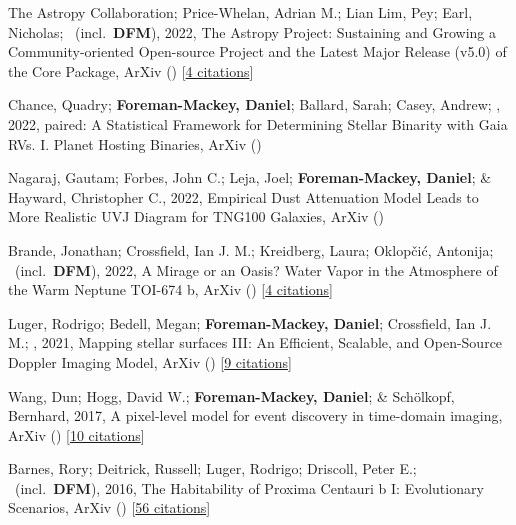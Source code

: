 \item[{\color{numcolor}\scriptsize9}] The Astropy Collaboration; Price-Whelan, Adrian M.; Lian Lim, Pey; Earl, Nicholas; \etal\ (incl.\ \textbf{DFM}), 2022, The Astropy Project: Sustaining and Growing a Community-oriented Open-source Project and the Latest Major Release (v5.0) of the Core Package, ArXiv () [\href{https://ui.adsabs.harvard.edu/abs/2022arXiv220614220T}{4 citations}]

\item[{\color{numcolor}\scriptsize8}] Chance, Quadry; \textbf{Foreman-Mackey, Daniel}; Ballard, Sarah; Casey, Andrew; \etal, 2022, paired: A Statistical Framework for Determining Stellar Binarity with Gaia RVs. I. Planet Hosting Binaries, ArXiv ()

\item[{\color{numcolor}\scriptsize7}] Nagaraj, Gautam; Forbes, John C.; Leja, Joel; \textbf{Foreman-Mackey, Daniel}; \& Hayward, Christopher C., 2022, Empirical Dust Attenuation Model Leads to More Realistic UVJ Diagram for TNG100 Galaxies, ArXiv ()

\item[{\color{numcolor}\scriptsize6}] Brande, Jonathan; Crossfield, Ian J. M.; Kreidberg, Laura; Oklop{\v{c}}i{\'c}, Antonija; \etal\ (incl.\ \textbf{DFM}), 2022, A Mirage or an Oasis? Water Vapor in the Atmosphere of the Warm Neptune TOI-674 b, ArXiv () [\href{https://ui.adsabs.harvard.edu/abs/2022arXiv220104197B}{4 citations}]

\item[{\color{numcolor}\scriptsize5}] Luger, Rodrigo; Bedell, Megan; \textbf{Foreman-Mackey, Daniel}; Crossfield, Ian J. M.; \etal, 2021, Mapping stellar surfaces III: An Efficient, Scalable, and Open-Source Doppler Imaging Model, ArXiv () [\href{https://ui.adsabs.harvard.edu/abs/2021arXiv211006271L}{9 citations}]

\item[{\color{numcolor}\scriptsize4}] Wang, Dun; Hogg, David W.; \textbf{Foreman-Mackey, Daniel}; \& Sch{\"o}lkopf, Bernhard, 2017, A pixel-level model for event discovery in time-domain imaging, ArXiv () [\href{https://ui.adsabs.harvard.edu/abs/2017arXiv171002428W}{10 citations}]

\item[{\color{numcolor}\scriptsize3}] Barnes, Rory; Deitrick, Russell; Luger, Rodrigo; Driscoll, Peter E.; \etal\ (incl.\ \textbf{DFM}), 2016, The Habitability of Proxima Centauri b I: Evolutionary Scenarios, ArXiv () [\href{https://ui.adsabs.harvard.edu/abs/2016arXiv160806919B}{56 citations}]

